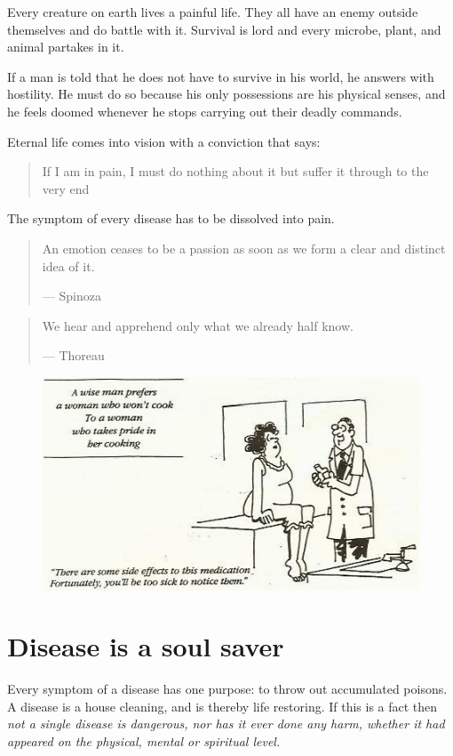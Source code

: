 \documentclass[12pt,letterpaper]{article}
\begin{document}
Every creature on earth lives a painful life. They all have an enemy
outside themselves and do battle with it. Survival is lord and every
microbe, plant, and animal partakes in it.

If a man is told that he does not have to survive in his world, he
answers with hostility. He must do so because his only possessions are
his physical senses, and he feels doomed whenever he stops carrying
out their deadly commands.

Eternal life comes into vision with a conviction that says:
\begin{quote} If I am in pain, I must do nothing about it but suffer
it through to the very end
\end{quote} The symptom of every disease has to be dissolved into
pain.

\begin{quote} An emotion ceases to be a passion as soon as we form a
clear and distinct idea of it.

--- Spinoza
\end{quote}

\begin{quote} We hear and apprehend only what we already half know.

--- Thoreau
\end{quote}


\begin{figure} \centering
  \includegraphics[width=\textwidth,bb= 0 0 476 269]{p24.jpg}
\end{figure}


\section{Disease is a soul saver}
\label{sec:diass}

Every symptom of a disease has one purpose: to throw out accumulated
poisons. A disease is a house cleaning, and is thereby life
restoring. If this is a fact then \emph{not a single disease is
dangerous, nor has it ever done any harm, whether it had appeared on
the physical, mental or spiritual level.}
\end{document}
